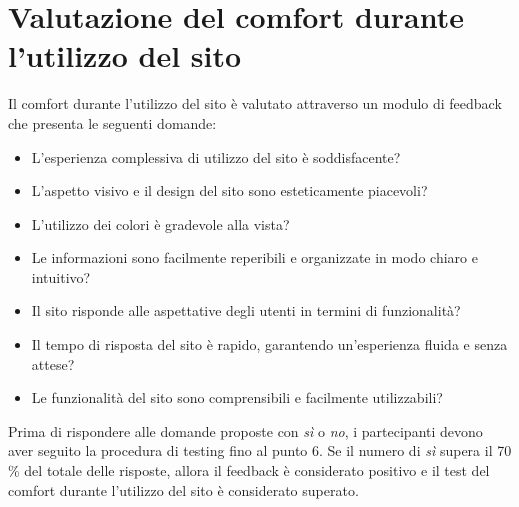 \documentclass{article}
\begin{document}
\section{Valutazione del comfort durante l'utilizzo del sito}
Il comfort durante l'utilizzo del sito è valutato attraverso un modulo di feedback che presenta le seguenti domande:
\begin{itemize}
    \item L'esperienza complessiva di utilizzo del sito è soddisfacente?
    \item L'aspetto visivo e il design del sito sono esteticamente piacevoli?
    \item L'utilizzo dei colori è gradevole alla vista?
    \item Le informazioni sono facilmente reperibili e organizzate in modo chiaro e intuitivo?
    \item Il sito risponde alle aspettative degli utenti in termini di funzionalità?
    \item Il tempo di risposta del sito è rapido, garantendo un'esperienza fluida e senza attese?
    \item Le funzionalità del sito sono comprensibili e facilmente utilizzabili?
\end{itemize}
Prima di rispondere alle domande proposte con \textit{sì} o \textit{no}, i partecipanti devono aver seguito la procedura di testing fino al punto 6. Se il numero di \textit{sì} supera il 70 \% del totale delle risposte, allora il feedback è considerato positivo e il test del comfort durante l'utilizzo del sito è considerato superato.
\end{document}
